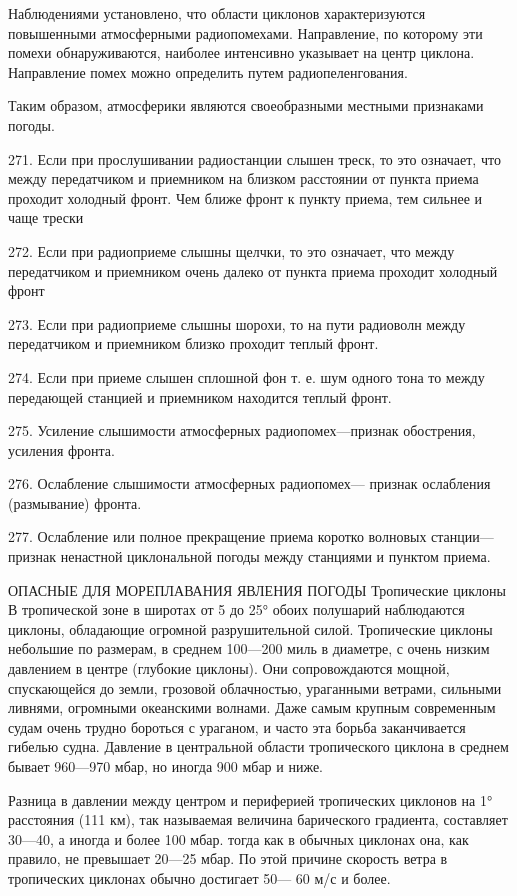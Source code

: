 Наблюдениями установлено, что области циклонов характеризуются повышенными атмосферными радиопомехами. Направление, по которому эти помехи обнаруживаются, наиболее интенсивно указывает на центр циклона. Направление помех можно определить путем радиопеленгования.

Таким образом, атмосферики являются своеобразными местными признаками погоды.

271. Если при прослушивании радиостанции слышен треск, то это означает, что между передатчиком и приемником на близком расстоянии от пункта приема проходит холодный фронт. Чем ближе фронт к пункту приема, тем сильнее и чаще трески

272. Если при радиоприеме слышны щелчки, то это означает, что между передатчиком и приемником очень далеко от пункта приема проходит холодный фронт

273. Если при радиоприеме слышны шорохи, то на пути радиоволн между передатчиком и приемником близко проходит теплый фронт.

274. Если при приеме слышен сплошной фон т. е. шум одного тона то между передающей станцией и приемником находится теплый фронт.

275. Усиление слышимости атмосферных радиопомех—признак обострения, усиления фронта.

276. Ослабление слышимости атмосферных радиопомех— признак ослабления (размывание) фронта.

277. Ослабление или полное прекращение приема коротко волновых станции—признак ненастной циклональной погоды между станциями и пунктом приема.

ОПАСНЫЕ ДЛЯ МОРЕПЛАВАНИЯ ЯВЛЕНИЯ ПОГОДЫ
Тропические циклоны
В тропической зоне в широтах от 5 до 25° обоих полушарий наблюдаются циклоны, обладающие огромной разрушительной силой. Тропические циклоны небольшие по размерам, в среднем 100—200 миль в диаметре, с очень низким давлением в центре (глубокие циклоны). Они сопровождаются мощной, спускающейся до земли, грозовой облачностью, ураганными ветрами, сильными ливнями, огромными океанскими волнами. Даже самым крупным современным судам очень трудно бороться с ураганом, и часто эта борьба заканчивается гибелью судна. Давление в центральной области тропического циклона в среднем бывает 960—970 мбар, но иногда 900 мбар и ниже.

Разница в давлении между центром и периферией тропических циклонов на 1° расстояния (111 км), так называемая величина барического градиента, составляет 30—40, а иногда и более 100 мбар. тогда как в обычных циклонах она, как правило, не превышает 20—25 мбар. По этой причине скорость ветра в тропических циклонах обычно достигает 50— 60 м/с и более.

